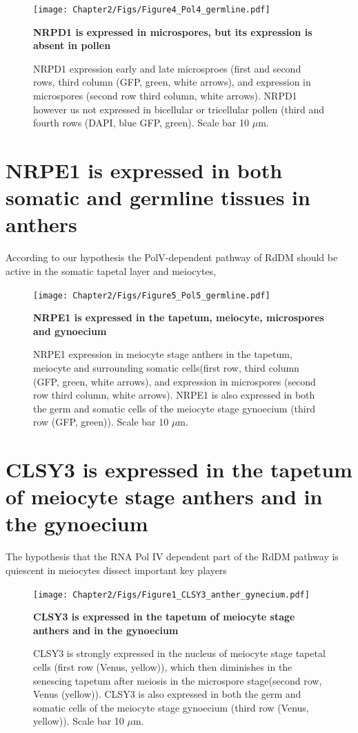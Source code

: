 \begin{figure}[htbp!] 
\centering    
    \texttt{[image: Chapter2/Figs/Figure4\_Pol4\_germline.pdf]}
\caption{\textbf{NRPD1 is expressed in microspores, but its expression is absent in pollen}}
\label{fig:Pol4_germ}
\captionsetup{font=small}
    \caption*{NRPD1 expression early and late microsproes (first and second rows, third column (GFP, green, white arrows), and expression in microspores (second row third column, white arrows). NRPD1 however us not expressed in bicellular or tricellular pollen (third and fourth rows (DAPI, blue GFP, green). Scale bar 10 $\mu$m.}
\end{figure}

\section{NRPE1 is expressed in both somatic and germline tissues in  anthers}

According to our hypothesis the PolV-dependent pathway of RdDM should be active in the somatic tapetal layer and meiocytes, 


\begin{figure}[htbp!] 
\centering    
    \texttt{[image: Chapter2/Figs/Figure5\_Pol5\_germline.pdf]}
\caption{\textbf{NRPE1 is expressed in the tapetum, meiocyte, microspores and gynoecium}}
\label{fig:Pol5_germ}
\captionsetup{font=small}
    \caption*{NRPE1 expression in meiocyte stage anthers in the tapetum, meiocyte and surrounding somatic cells(first row, third column (GFP, green, white arrows), and expression in microspores (second row third column, white arrows). NRPE1 is also expressed in both the germ and somatic cells of the meiocyte stage gynoecium (third row (GFP, green)). Scale bar 10 $\mu$m.}
\end{figure}


\section{CLSY3 is expressed in the tapetum of meiocyte stage anthers and in the gynoecium}
The hypothesis that the RNA Pol IV dependent part of the RdDM pathway is quiescent in meiocytes  dissect important key players 


\begin{figure}[htbp!] 
\centering    
    \texttt{[image: Chapter2/Figs/Figure1\_CLSY3\_anther\_gynecium.pdf]}
\caption{\textbf{CLSY3 is expressed in the tapetum of meiocyte stage anthers and in the gynoecium}}
\label{fig:CLSY3_anther}
\captionsetup{font=small}
    \caption*{CLSY3 is strongly expressed in the nucleus of meiocyte stage tapetal cells (first row (Venus, yellow)), which then diminishes in the senescing tapetum after meiosis in the microspore stage(second row, Venus (yellow)). CLSY3 is also expressed in both the germ and somatic cells of the meiocyte stage gynoecium (third row (Venus, yellow)). Scale bar 10 $\mu$m.}
\end{figure}

